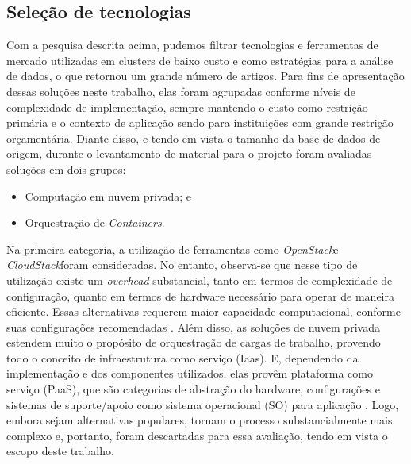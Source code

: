 \subsection{Seleção de tecnologias}

Com a pesquisa descrita acima, pudemos filtrar tecnologias e ferramentas de mercado utilizadas em clusters de baixo custo e como estratégias para a análise de dados, o que retornou um grande número de artigos.  Para fins de apresentação dessas soluções neste trabalho, elas foram agrupadas conforme níveis de complexidade de implementação, sempre mantendo o custo como restrição primária e o contexto de aplicação sendo para instituições com grande restrição orçamentária.
Diante disso, e tendo em vista o tamanho da base de dados de origem, durante o levantamento de material para o projeto foram avaliadas soluções em dois grupos:

\begin{itemize}
    \item Computação em nuvem privada; e
    \item Orquestração de \emph{Containers}.
\end{itemize}



Na primeira categoria, a utilização de ferramentas como \emph{OpenStack}\textregistered e \emph{CloudStack}\textregistered foram consideradas. No entanto, observa-se que nesse tipo de utilização existe um \emph{overhead} substancial, tanto em termos de complexidade de configuração, quanto em termos de hardware necessário para operar de maneira eficiente. Essas alternativas requerem maior capacidade computacional, conforme suas configurações recomendadas \cite{cloudstack,openstack}. Além disso, as soluções de nuvem privada estendem muito o propósito de orquestração de cargas de trabalho, provendo todo o conceito de infraestrutura como serviço (Iaas). E, dependendo da implementação e dos componentes utilizados, elas provêm plataforma como serviço (PaaS), que são categorias de abstração do hardware, configurações e sistemas de suporte/apoio como sistema operacional (SO) para aplicação \cite{openstack,cloudstack,mell_nist_2011}. Logo, embora sejam alternativas populares, tornam o processo substancialmente mais complexo e, portanto, foram descartadas para essa avaliação, tendo em vista o escopo deste trabalho.

